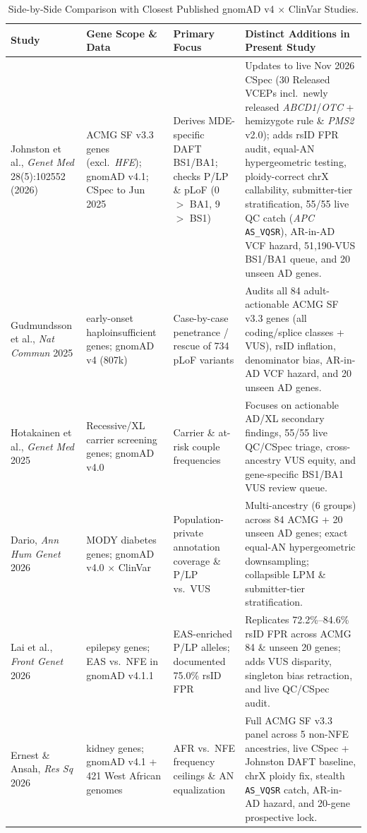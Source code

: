 \documentclass[11pt,letterpaper]{article}
\begin{document}
\begin{table}[H]
\centering
\caption{Side-by-Side Comparison with Closest Published gnomAD v4 $\times$ ClinVar Studies.}
\label{tab:prior_art}
\scriptsize
\setlength{\tabcolsep}{4pt}
\begin{tabularx}{\textwidth}{>{\raggedright\arraybackslash}p{2.5cm}>{\raggedright\arraybackslash}p{2.6cm}>{\raggedright\arraybackslash}p{3.2cm}>{\raggedright\arraybackslash}X}
\toprule
\textbf{Study} & \textbf{Gene Scope \& Data} & \textbf{Primary Focus} & \textbf{Distinct Additions in Present Study} \\
\midrule
Johnston et al., \textit{Genet Med} 28(5):102552 (2026) \citep{johnston2026daft} & 83 ACMG SF v3.3 genes (excl.\ \textit{HFE}); gnomAD v4.1; CSpec to Jun 2025 & Derives MDE-specific DAFT BS1/BA1; checks P/LP \& pLoF (0 $>$ BA1, 9 $>$ BS1) & Updates to live Nov 2026 CSpec (30 Released VCEPs incl.\ newly released \textit{ABCD1}/\textit{OTC} + hemizygote rule \& \textit{PMS2} v2.0); adds rsID FPR audit, equal-AN hypergeometric testing, ploidy-correct chrX callability, submitter-tier stratification, 55/55 live QC catch (\textit{APC} \texttt{AS\_VQSR}), AR-in-AD VCF hazard, 51,190-VUS BS1/BA1 queue, and 20 unseen AD genes. \\
Gudmundsson et al., \textit{Nat Commun} 2025 \citep{gudmundsson2025penetrance} & 77 early-onset haploinsufficient genes; gnomAD v4 (807k) & Case-by-case penetrance / rescue of 734 pLoF variants & Audits all 84 adult-actionable ACMG SF v3.3 genes (all coding/splice classes + VUS), rsID inflation, denominator bias, AR-in-AD VCF hazard, and 20 unseen AD genes. \\
Hotakainen et al., \textit{Genet Med} 2025 \citep{hotakainen2025carrier} & Recessive/XL carrier screening genes; gnomAD v4.0 & Carrier \& at-risk couple frequencies & Focuses on actionable AD/XL secondary findings, 55/55 live QC/CSpec triage, cross-ancestry VUS equity, and gene-specific BS1/BA1 VUS review queue. \\
Dario, \textit{Ann Hum Genet} 2026 \citep{dario2026mody} & 16 MODY diabetes genes; gnomAD v4.0 $\times$ ClinVar & Population-private annotation coverage \& P/LP vs.\ VUS & Multi-ancestry (6 groups) across 84 ACMG + 20 unseen AD genes; exact equal-AN hypergeometric downsampling; collapsible LPM \& submitter-tier stratification. \\
Lai et al., \textit{Front Genet} 2026 \citep{lai2026epilepsy} & 199 epilepsy genes; EAS vs.\ NFE in gnomAD v4.1.1 & EAS-enriched P/LP alleles; documented 75.0\% rsID FPR & Replicates 72.2\%--84.6\% rsID FPR across ACMG 84 \& unseen 20 genes; adds VUS disparity, singleton bias retraction, and live QC/CSpec audit. \\
Ernest \& Ansah, \textit{Res Sq} 2026 \citep{ernest2026kidney} & 32 kidney genes; gnomAD v4.1 + 421 West African genomes & AFR vs.\ NFE frequency ceilings \& AN equalization & Full ACMG SF v3.3 panel across 5 non-NFE ancestries, live CSpec + Johnston DAFT baseline, chrX ploidy fix, stealth \texttt{AS\_VQSR} catch, AR-in-AD hazard, and 20-gene prospective lock. \\
\bottomrule
\end{tabularx}
\end{table}
\end{document}
